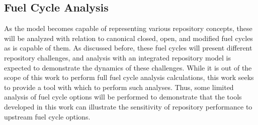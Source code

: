 \subsection{Fuel Cycle Analysis}

As the model becomes capable of representing various repository concepts, these will  
be analyzed with relation to canonical closed, open, and modified fuel cycles as  
\Cyclus is capable of them. As discussed before, these fuel cycles will present 
different repository challenges, and analysis with an integrated repository 
model is expected to demonstrate the dynamics of these challenges. While it is 
out of the scope of this work to perform full fuel cycle analysis calculations, 
this work seeks to provide a tool with which to perform such analyses. 
Thus, some limited analysis of fuel cycle options will be performed to demonstrate 
that the tools developed in this work can illustrate the sensitivity of repository 
performance to upstream fuel cycle options.



